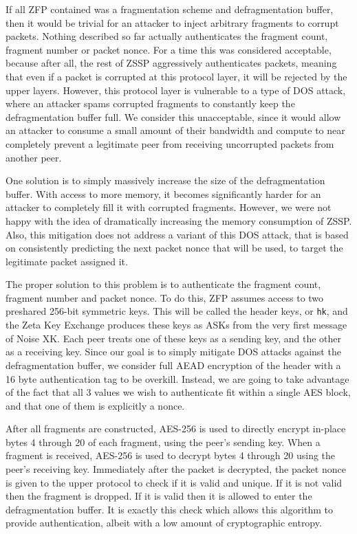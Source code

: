 \documentclass{article}
\begin{document}
If all ZFP contained was a fragmentation scheme and defragmentation buffer, then it would be trivial for an attacker to inject arbitrary fragments to corrupt packets. Nothing described so far actually authenticates the fragment count, fragment number or packet nonce. For a time this was considered acceptable, because after all, the rest of ZSSP aggressively authenticates packets, meaning that even if a packet is corrupted at this protocol layer, it will be rejected by the upper layers. However, this protocol layer is vulnerable to a type of DOS attack, where an attacker spams corrupted fragments to constantly keep the defragmentation buffer full. We consider this unacceptable, since it would allow an attacker to consume a small amount of their bandwidth and compute to near completely prevent a legitimate peer from receiving uncorrupted packets from another peer.

One solution is to simply massively increase the size of the defragmentation buffer. With access to more memory, it becomes significantly harder for an attacker to completely fill it with corrupted fragments. However, we were not happy with the idea of dramatically increasing the memory consumption of ZSSP. Also, this mitigation does not address a variant of this DOS attack, that is based on consistently predicting the next packet nonce that will be used, to target the legitimate packet assigned it.

The proper solution to this problem is to authenticate the fragment count, fragment number and packet nonce. To do this, ZFP assumes access to two preshared 256-bit symmetric keys. This will be called the header keys, or \texttt{hk}, and the Zeta Key Exchange produces these keys as ASKs from the very first message of Noise XK. Each peer treats one of these keys as a sending key, and the other as a receiving key. Since our goal is to simply mitigate DOS attacks against the defragmentation buffer, we consider full AEAD encryption of the header with a 16 byte authentication tag to be overkill. Instead, we are going to take advantage of the fact that all 3 values we wish to authenticate fit within a single AES block, and that one of them is explicitly a nonce.

After all fragments are constructed, AES-256 \cite{fips_aes} is used to directly encrypt in-place bytes 4 through 20 of each fragment, using the peer's sending key. When a fragment is received, AES-256 is used to decrypt bytes 4 through 20 using the peer's receiving key. Immediately after the packet is decrypted, the packet nonce is given to the upper protocol to check if it is valid and unique. If it is not valid then the fragment is dropped. If it is valid then it is allowed to enter the defragmentation buffer. It is exactly this check which allows this algorithm to provide authentication, albeit with a low amount of cryptographic entropy.
\end{document}
